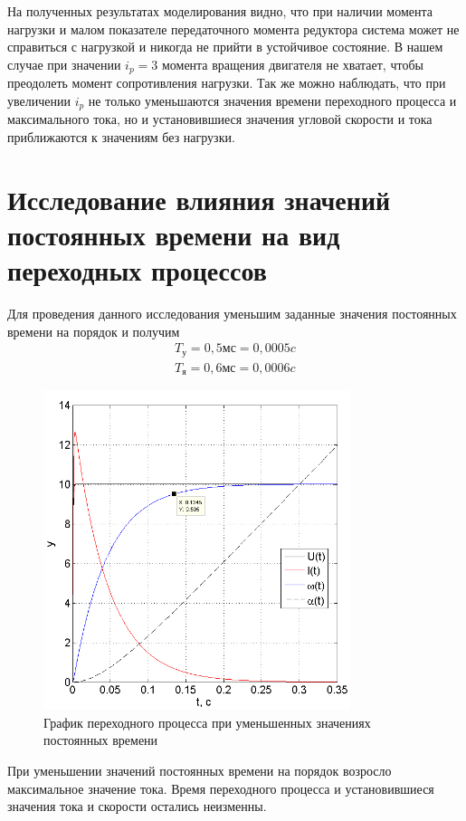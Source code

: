 \documentclass[fleqn, a4paper, 11pt, russian]{article}
\begin{document}
	\newpage
	На полученных результатах моделирования видно, что при наличии момента нагрузки и малом показателе передаточного момента редуктора система может не справиться с нагрузкой и никогда не прийти в устойчивое состояние. В нашем случае при значении $i_p = 3$ момента вращения двигателя не хватает, чтобы преодолеть момент сопротивления нагрузки. Так же можно наблюдать, что при увеличении $i_p$ не только уменьшаются значения времени переходного процесса и максимального тока, но и установившиеся значения угловой скорости и тока приближаются к значениям без нагрузки.
	\clearpage
	\section{Исследование влияния значений постоянных времени на вид переходных процессов}
	Для проведения данного исследования уменьшим заданные значения постоянных времени на порядок и получим
	\begin{align}
		T_\text{у} = 0,5 \text{мс} = 0,0005 c\\
		T_\text{я} = 0,6 \text{мс} = 0,0006 c
	\end{align}
	\begin{figure}[ht!]
		\centering
		\includegraphics[width = 0.8\textwidth]{Tvar}
		\caption{График переходного процесса при уменьшенных значениях постоянных времени}
		\label{TVar}
	\end{figure}
	
	При уменьшении значений постоянных времени на порядок возросло максимальное значение тока. Время переходного процесса и установившиеся значения тока и скорости остались неизменны.
	\clearpage
\end{document}
